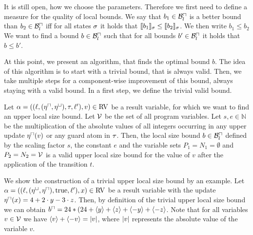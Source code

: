 It is still open, how we choose the parameters.
Therefore we first need to define a measure for the quality of local bounds.
We say that $b_1 \in \mathcal{B}^\sqcap_l$ is a better bound than $b_2 \in \mathcal{B}^\sqcap_l$ iff for all states $\sigma$ it holds that $\llbracket b_1 \rrbracket_{\sigma} \leq \llbracket b_2 \rrbracket_{\sigma}$.
We then write $b_1 \leq b_2$
We want to find a bound $b \in \mathcal{B}^\sqcap_l$ such that for all bounds $b' \in \mathcal{B}^\sqcap_l$ it holds that $b \leq b'$.

At this point, we present an algorithm, that finds the optimal bound $b$.
The idea of this algorithm is to start with a trivial bound, that is always valid.
Then, we take multiple steps for a component-wise improvement of this bound, always staying with a valid bound.
In a first step, we define the trivial valid bound.

\begin{definition}
  Let $\alpha = ((\ell,(\eta^\sqcap,\eta^\sqcup),\tau,\ell'),v) \in \text{RV}$ be a result variable, for which we want to find an upper local size bound.
  Let $\mathcal{V}$ be the set of all program variables.
  Let $s, e \in \mathbb{N}$ be the multiplication of the absolute values of all integers occurring in any upper update $\eta^\sqcap(v)$ or any guard atom in $\tau$.
  Then, the local size bound $b \in \mathcal{B}^\sqcap_l$ defined by the scaling factor $s$, the constant $e$ and the variable sets $P_1 = N_1 = \emptyset$ and $P_2 = N_2 = \mathcal{V}$ is a valid upper local size bound for the value of $v$ after the application of the transition $t$.
\end{definition}


We show the construction of a trivial upper local size bound by an example.
Let $\alpha = ((\ell,(\eta^\sqcup,\eta^\sqcap),\text{true},\ell'),x) \in \text{RV}$ be a result variable with the update $\eta^\sqcap(x) = 4 + 2 \cdot y - 3 \cdot z$.
Then, by definition of the trivial upper local size bound we can obtain $b^\sqcap = 24 * (24 + \langle y\rangle + \langle z\rangle + \langle-y\rangle + \langle-z\rangle$.
Note that for all variables $v \in \mathcal{V}$ we have $\langle v\rangle + \langle-v\rangle = \left|v\right|$, where $\left|v\right|$ represents the absolute value of the variable $v$.

